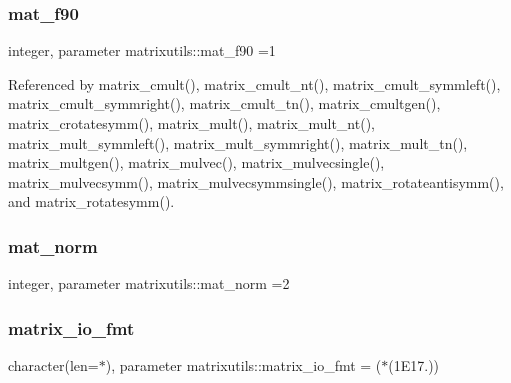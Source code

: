 \mbox{\label{namespacematrixutils_aacea55dcb267854e5e8df85c57122892}} 
\subsubsection{\texorpdfstring{mat\+\_\+f90}{mat\_f90}}
{\footnotesize\ttfamily integer, parameter matrixutils\+::mat\+\_\+f90 =1}



Referenced by matrix\+\_\+cmult(), matrix\+\_\+cmult\+\_\+nt(), matrix\+\_\+cmult\+\_\+symmleft(), matrix\+\_\+cmult\+\_\+symmright(), matrix\+\_\+cmult\+\_\+tn(), matrix\+\_\+cmultgen(), matrix\+\_\+crotatesymm(), matrix\+\_\+mult(), matrix\+\_\+mult\+\_\+nt(), matrix\+\_\+mult\+\_\+symmleft(), matrix\+\_\+mult\+\_\+symmright(), matrix\+\_\+mult\+\_\+tn(), matrix\+\_\+multgen(), matrix\+\_\+mulvec(), matrix\+\_\+mulvecsingle(), matrix\+\_\+mulvecsymm(), matrix\+\_\+mulvecsymmsingle(), matrix\+\_\+rotateantisymm(), and matrix\+\_\+rotatesymm().

\mbox{\label{namespacematrixutils_a2ff32238b426e2f5a4e9d86da72402d2}} 
\subsubsection{\texorpdfstring{mat\+\_\+norm}{mat\_norm}}
{\footnotesize\ttfamily integer, parameter matrixutils\+::mat\+\_\+norm =2}

\mbox{\label{namespacematrixutils_a34badd98b6ee7acb8ca038472adf2912}} 
\subsubsection{\texorpdfstring{matrix\+\_\+io\+\_\+fmt}{matrix\_io\_fmt}}
{\footnotesize\ttfamily character(len=$\ast$), parameter matrixutils\+::matrix\+\_\+io\+\_\+fmt = \textquotesingle{}($\ast$(1\+E17.))\textquotesingle{}}




